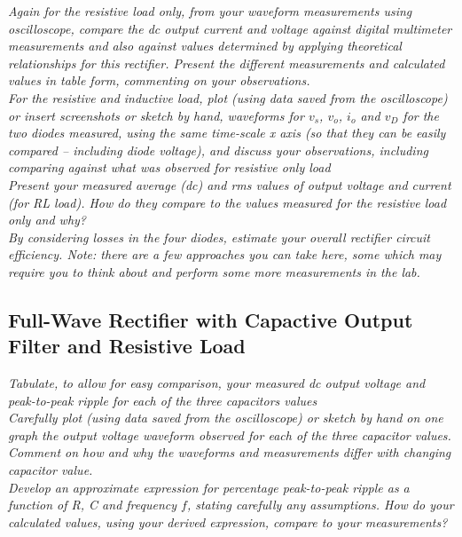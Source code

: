 \documentclass[12pt,a4paper]{article}
\begin{document}
\textit{Again for the resistive load only, from your waveform measurements using oscilloscope, compare
the dc output current and voltage against digital multimeter measurements and also against values
determined by applying theoretical relationships for this rectifier. Present the different measurements
and calculated values in table form, commenting on your observations.}\\

\textit{For the resistive and inductive load, plot (using data saved from the oscilloscope) or insert
screenshots or sketch by hand, waveforms for $v_s$, $v_o$, $i_o$ and $v_D$ for the two diodes measured, using
the same time-scale x axis (so that they can be easily compared – including diode voltage), and
discuss your observations, including comparing against what was observed for resistive only load}\\

\textit{Present your measured average (dc) and rms values of output voltage and current (for RL load).
How do they compare to the values measured for the resistive load only and why?}\\

\textit{By considering losses in the four diodes, estimate your overall rectifier circuit efficiency. Note: there
are a few approaches you can take here, some which may require you to think about and perform
some more measurements in the lab.}\\
\subsection{Full-Wave Rectifier with Capactive Output Filter and Resistive Load}
\textit{Tabulate, to allow for easy comparison, your measured dc output voltage and peak-to-peak ripple
for each of the three capacitors values}\\

\textit{Carefully plot (using data saved from the oscilloscope) or sketch by hand on one graph the output
voltage waveform observed for each of the three capacitor values. Comment on how and why the
waveforms and measurements differ with changing capacitor value.}\\

\textit{Develop an approximate expression for percentage peak-to-peak ripple as a function of R, C and
frequency $f$, stating carefully any assumptions. How do your calculated values, using your derived
expression, compare to your measurements?}\\
\end{document}
